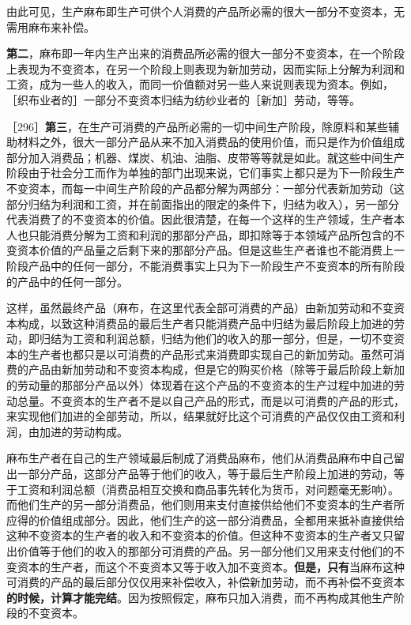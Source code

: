 由此可见，生产麻布即生产可供个人消费的产品所必需的很大一部分不变资本，无需用麻布来补偿。

\textbf{第二}，麻布即一年内生产出来的消费品所必需的很大一部分不变资本，在一个阶段上表现为不变资本，在另一个阶段上则表现为新加劳动，因而实际上分解为利润和工资，成为一些人的收入，而同一价值额对另一些人来说则表现为资本。例如，［织布业者的］一部分不变资本归结为纺纱业者的［新加］劳动，等等。

［296］\textbf{第三}，在生产可消费的产品所必需的一切中间生产阶段，除原料和某些辅助材料之外，很大一部分产品从来不加入消费品的使用价值，而只是作为价值组成部分加入消费品；机器、煤炭、机油、油脂、皮带等等就是如此。就这些中间生产阶段由于社会分工而作为单独的部门出现来说，它们事实上都只是为下一阶段生产不变资本，而每一中间生产阶段的产品都分解为两部分：一部分代表新加劳动（这部分归结为利润和工资，并在前面指出的限定的条件下，归结为收入），另一部分代表消费了的不变资本的价值。因此很清楚，在每一个这样的生产领域，生产者本人也只能消费分解为工资和利润的那部分产品，即扣除等于本领域产品所包含的不变资本价值的产品量之后剩下来的那部分产品。但是这些生产者谁也不能消费上一阶段产品中的任何一部分，不能消费事实上只为下一阶段生产不变资本的所有阶段的产品中的任何一部分。

这样，虽然最终产品（麻布，在这里代表全部可消费的产品）由新加劳动和不变资本构成，以致这种消费品的最后生产者只能消费产品中归结为最后阶段上加进的劳动，即归结为工资和利润总额，归结为他们的收入的那一部分，但是，一切不变资本的生产者也都只是以可消费的产品形式来消费即实现自己的新加劳动。虽然可消费的产品由新加劳动和不变资本构成，但是它的购买价格（除等于最后阶段上新加的劳动量的那部分产品以外）体现着在这个产品的不变资本的生产过程中加进的劳动总量。不变资本的生产者不是以自己产品的形式，而是以可消费的产品的形式，来实现他们加进的全部劳动，所以，结果就好比这个可消费的产品仅仅由工资和利润，由加进的劳动构成。

麻布生产者在自己的生产领域最后制成了消费品麻布，他们从消费品麻布中自己留出一部分产品，这部分产品等于他们的收入，等于最后生产阶段上加进的劳动，等于工资和利润总额（消费品相互交换和商品事先转化为货币，对问题毫无影响）。而他们生产的另一部分消费品，他们则用来支付直接供给他们不变资本的生产者所应得的价值组成部分。因此，他们生产的这一部分消费品，全都用来抵补直接供给这种不变资本的生产者的收入和不变资本的价值。但这种不变资本的生产者又只留出价值等于他们的收入的那部分可消费的产品。另一部分他们又用来支付他们的不变资本的生产者，而这个不变资本又等于收入加不变资本。\textbf{但是，只有}当麻布这种可消费的产品的最后部分仅仅用来补偿收入，补偿新加劳动，而不再补偿不变资本\textbf{的时候，计算才能完结}。因为按照假定，麻布只加入消费，而不再构成其他生产阶段的不变资本。

